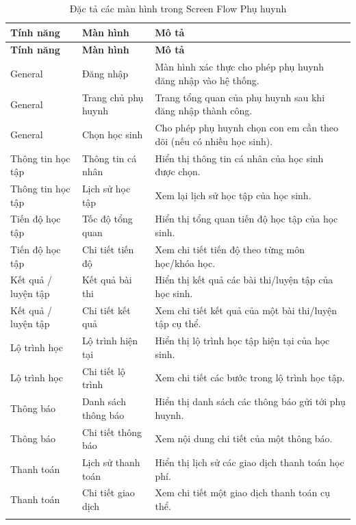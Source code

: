\documentclass[12pt,a4paper,oneside]{report}
\begin{document}
\renewcommand{\arraystretch}{1.12}
\begin{longtable}{|p{3.0cm}|p{4.1cm}|p{7.0cm}|}
\hline
\rowcolor{orange!15}
\textbf{Tính năng} & \textbf{Màn hình} & \textbf{Mô tả} \\ \hline
\endfirsthead
\hline
\rowcolor{orange!15}
\textbf{Tính năng} & \textbf{Màn hình} & \textbf{Mô tả} \\ \hline
\endhead
General & Đăng nhập & Màn hình xác thực cho phép phụ huynh đăng nhập vào hệ thống. \\ \hline
General & Trang chủ phụ huynh & Trang tổng quan của phụ huynh sau khi đăng nhập thành công. \\ \hline
General & Chọn học sinh & Cho phép phụ huynh chọn con em cần theo dõi (nếu có nhiều học sinh). \\ \hline
Thông tin học tập & Thông tin cá nhân & Hiển thị thông tin cá nhân của học sinh được chọn. \\ \hline
Thông tin học tập & Lịch sử học tập & Xem lại lịch sử học tập của học sinh. \\ \hline
Tiến độ học tập & Tốc độ tổng quan & Hiển thị tổng quan tiến độ học tập của học sinh. \\ \hline
Tiến độ học tập & Chi tiết tiến độ & Xem chi tiết tiến độ theo từng môn học/khóa học. \\ \hline
Kết quả / luyện tập & Kết quả bài thi & Hiển thị kết quả các bài thi/luyện tập của học sinh. \\ \hline
Kết quả / luyện tập & Chi tiết kết quả & Xem chi tiết kết quả của một bài thi/luyện tập cụ thể. \\ \hline
Lộ trình học & Lộ trình hiện tại & Hiển thị lộ trình học tập hiện tại của học sinh. \\ \hline
Lộ trình học & Chi tiết lộ trình & Xem chi tiết các bước trong lộ trình học tập. \\ \hline
Thông báo & Danh sách thông báo & Hiển thị danh sách các thông báo gửi tới phụ huynh. \\ \hline
Thông báo & Chi tiết thông báo & Xem nội dung chi tiết của một thông báo. \\ \hline
Thanh toán & Lịch sử thanh toán & Hiển thị lịch sử các giao dịch thanh toán học phí. \\ \hline
Thanh toán & Chi tiết giao dịch & Xem chi tiết một giao dịch thanh toán cụ thể. \\ \hline
\caption{Đặc tả các màn hình trong Screen Flow Phụ huynh}
\end{longtable}
\clearpage
\end{document}

